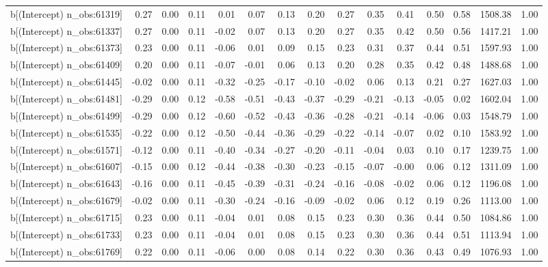 \begin{table}[ht]
\begin{tabular}{rrrrrrrrrrrrrrr}
  b[(Intercept) n\_obs:61319] & 0.27 & 0.00 & 0.11 & 0.01 & 0.07 & 0.13 & 0.20 & 0.27 & 0.35 & 0.41 & 0.50 & 0.58 & 1508.38 & 1.00 \\ 
  b[(Intercept) n\_obs:61337] & 0.27 & 0.00 & 0.11 & -0.02 & 0.07 & 0.13 & 0.20 & 0.27 & 0.35 & 0.42 & 0.50 & 0.56 & 1417.21 & 1.00 \\ 
  b[(Intercept) n\_obs:61373] & 0.23 & 0.00 & 0.11 & -0.06 & 0.01 & 0.09 & 0.15 & 0.23 & 0.31 & 0.37 & 0.44 & 0.51 & 1597.93 & 1.00 \\ 
  b[(Intercept) n\_obs:61409] & 0.20 & 0.00 & 0.11 & -0.07 & -0.01 & 0.06 & 0.13 & 0.20 & 0.28 & 0.35 & 0.42 & 0.48 & 1488.68 & 1.00 \\ 
  b[(Intercept) n\_obs:61445] & -0.02 & 0.00 & 0.11 & -0.32 & -0.25 & -0.17 & -0.10 & -0.02 & 0.06 & 0.13 & 0.21 & 0.27 & 1627.03 & 1.00 \\ 
  b[(Intercept) n\_obs:61481] & -0.29 & 0.00 & 0.12 & -0.58 & -0.51 & -0.43 & -0.37 & -0.29 & -0.21 & -0.13 & -0.05 & 0.02 & 1602.04 & 1.00 \\ 
  b[(Intercept) n\_obs:61499] & -0.29 & 0.00 & 0.12 & -0.60 & -0.52 & -0.43 & -0.36 & -0.28 & -0.21 & -0.14 & -0.06 & 0.03 & 1548.79 & 1.00 \\ 
  b[(Intercept) n\_obs:61535] & -0.22 & 0.00 & 0.12 & -0.50 & -0.44 & -0.36 & -0.29 & -0.22 & -0.14 & -0.07 & 0.02 & 0.10 & 1583.92 & 1.00 \\ 
  b[(Intercept) n\_obs:61571] & -0.12 & 0.00 & 0.11 & -0.40 & -0.34 & -0.27 & -0.20 & -0.11 & -0.04 & 0.03 & 0.10 & 0.17 & 1239.75 & 1.00 \\ 
  b[(Intercept) n\_obs:61607] & -0.15 & 0.00 & 0.12 & -0.44 & -0.38 & -0.30 & -0.23 & -0.15 & -0.07 & -0.00 & 0.06 & 0.12 & 1311.09 & 1.00 \\ 
  b[(Intercept) n\_obs:61643] & -0.16 & 0.00 & 0.11 & -0.45 & -0.39 & -0.31 & -0.24 & -0.16 & -0.08 & -0.02 & 0.06 & 0.12 & 1196.08 & 1.00 \\ 
  b[(Intercept) n\_obs:61679] & -0.02 & 0.00 & 0.11 & -0.30 & -0.24 & -0.16 & -0.09 & -0.02 & 0.06 & 0.12 & 0.19 & 0.26 & 1113.00 & 1.00 \\ 
  b[(Intercept) n\_obs:61715] & 0.23 & 0.00 & 0.11 & -0.04 & 0.01 & 0.08 & 0.15 & 0.23 & 0.30 & 0.36 & 0.44 & 0.50 & 1084.86 & 1.00 \\ 
  b[(Intercept) n\_obs:61733] & 0.23 & 0.00 & 0.11 & -0.04 & 0.01 & 0.08 & 0.15 & 0.23 & 0.30 & 0.36 & 0.44 & 0.51 & 1113.94 & 1.00 \\ 
  b[(Intercept) n\_obs:61769] & 0.22 & 0.00 & 0.11 & -0.06 & 0.00 & 0.08 & 0.14 & 0.22 & 0.30 & 0.36 & 0.43 & 0.49 & 1076.93 & 1.00 \\ 

\end{tabular}
\end{table}

